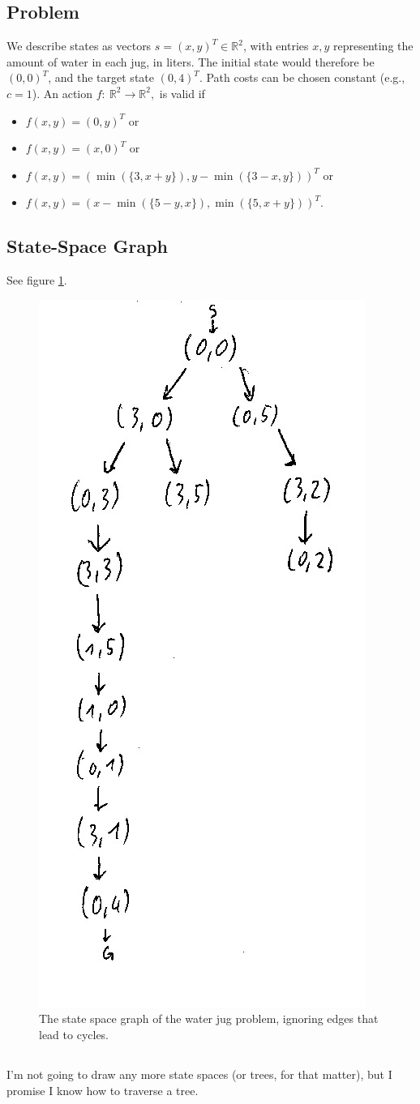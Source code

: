 \documentclass[11pt,a4paper]{scrartcl}
\newcommand{\IR}{\mathbb{R}}
\newcommand{\map}{\rightarrow}
\begin{document}
\subsection{Problem}
We describe states as vectors $s = (x,y)^T\in\IR^2$, with entries $x,y$ representing 
the amount of water in each jug, in liters. The initial state would therefore 
be $(0,0)^T$, and the target state $(0,4)^T$. Path costs can be chosen constant 
(e.g., $c=1$). An action $f:\ \IR^2\map\IR^2,$ is valid if

\begin{itemize}
\item $f(x,y) = (0,y)^T$ or
\item $f(x,y) = (x,0)^T$ or 
\item $f(x,y) = (\min(\{3, x+y\}), y-\min(\{3-x,y\}))^T$ or
\item $f(x,y) = (x-\min(\{5-y,x\}), \min(\{5,x+y\}))^T$.
\end{itemize}

\subsection{State-Space Graph}
See figure \ref{fig:water}.
\begin{figure}[ht]
 \includegraphics[width=.35\linewidth]{water_red.jpg}
 \caption{The state space graph of the water jug problem, ignoring edges that lead to cycles.}
 \label{fig:water}
\end{figure}

\subsection{}
I'm not going to draw any more state spaces (or trees, for that matter), but I promise I know how to traverse a tree.
\end{document}
